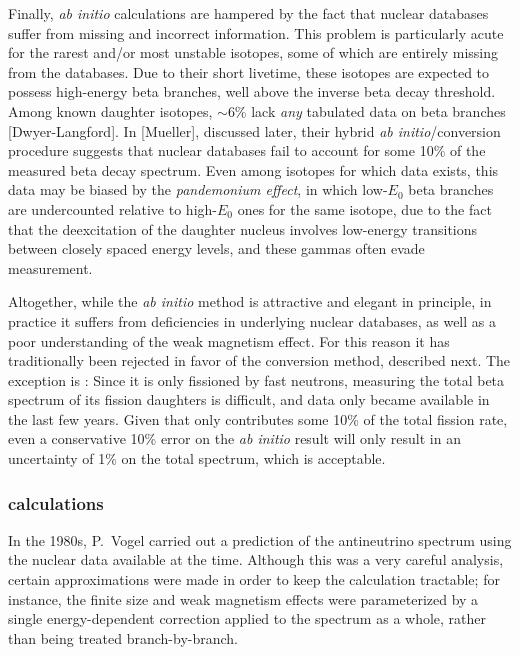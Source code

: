 \documentclass[../thesis.tex]{subfiles}
\begin{document}
Finally, \emph{ab initio} calculations are hampered by the fact that nuclear
databases suffer from missing and incorrect information. This problem is
particularly acute for the rarest and/or most unstable isotopes, some of which
are entirely missing from the databases. Due to their short livetime, these
isotopes are expected to possess high-energy beta branches, well above the
inverse beta decay threshold. Among known daughter isotopes, $\sim$6\% lack
\emph{any} tabulated data on beta branches [Dwyer-Langford]. In [Mueller],
discussed later, their hybrid \emph{ab initio}/conversion procedure suggests
that nuclear databases fail to account for some 10\% of the measured beta decay
spectrum. Even among isotopes for which data exists, this data may be biased by
the \emph{pandemonium effect}, in which low-$E_0$ beta branches are undercounted
relative to high-$E_0$ ones for the same isotope, due to the fact that the
deexcitation of the daughter nucleus involves low-energy transitions between
closely spaced energy levels, and these gammas often evade measurement.

Altogether, while the \emph{ab initio} method is attractive and elegant in
principle, in practice it suffers from deficiencies in underlying nuclear
databases, as well as a poor understanding of the weak magnetism effect. For
this reason it has traditionally been rejected in favor of the conversion
method, described next. The exception is \ureight: Since it is only fissioned by
fast neutrons, measuring the total beta spectrum of its fission daughters is
difficult, and data only became available in the last few years. Given that
\ureight only contributes some 10\% of the total fission rate, even a
conservative 10\% error on the \emph{ab initio} result will only result in an
uncertainty of 1\% on the total spectrum, which is acceptable.

\subsubsection{\ureight calculations}
\label{sec:vogel}

In the 1980s, P.~Vogel carried out a prediction of the \ureight antineutrino
spectrum using the nuclear data available at the time. Although this was a very
careful analysis, certain approximations were made in order to keep the
calculation tractable; for instance, the finite size and weak magnetism effects
were parameterized by a single energy-dependent correction applied to the
spectrum as a whole, rather than being treated branch-by-branch.
\end{document}
